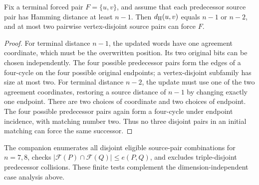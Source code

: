 \begin{lemma}\label{lem:local-reversal}
Fix a terminal forced pair $F=\{u,v\}$, and assume that each
predecessor source pair has Hamming distance at least $n-1$.
Then $d_{\rm H}(u,v)$ equals $n-1$ or $n-2$, and at most two
pairwise vertex-disjoint source pairs can force $F$.
\end{lemma}
\begin{proof}
For terminal distance $n-1$, the updated words have one agreement
coordinate, which must be the overwritten position. Its two original
bits can be chosen independently. The four possible predecessor
pairs form the edges of a four-cycle on the four possible original
endpoints; a vertex-disjoint subfamily has size at most two.
For terminal distance $n-2$, the update must use one of the two
agreement coordinates, restoring a source distance of $n-1$ by
changing exactly one endpoint. There are two choices of coordinate
and two choices of endpoint. The four possible predecessor pairs
again form a four-cycle under endpoint incidence, with matching
number two. Thus no three disjoint pairs in an initial matching
can force the same successor.
\end{proof}
\begin{remark}
The companion 
enumerates all disjoint eligible source-pair combinations for $n=7,8$,
checks $|\mathcal F(P)\cap\mathcal F(Q)|\le e(P,Q)$, and excludes
triple-disjoint predecessor collisions. These finite tests complement
the dimension-independent case analysis above.
\end{remark}
